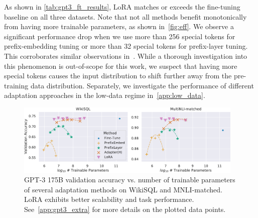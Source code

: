 As shown in \autoref{tab:gpt3_ft_results}, LoRA matches or exceeds the fine-tuning baseline on all three datasets.
Note that not all methods benefit monotonically from having more trainable parameters, as shown in~\autoref{fig:eff}.
We observe a significant performance drop when we use more than 256 special tokens for prefix-embedding tuning or more than 32 special tokens for prefix-layer tuning.
This corroborates similar observations in~\cite{li_prefix-tuning_2021}.
While a thorough investigation into this phenomenon is out-of-scope for this work, we suspect that having more special tokens causes the input distribution to shift further away from the pre-training data distribution.
Separately, we investigate the performance of different adaptation approaches in the low-data regime in~\autoref{app:low_data}.









\begin{figure}[h]
\centering
\includegraphics[width=0.97\textwidth]{figures/LoRA_wikisql.pdf}
\caption{GPT-3 175B validation accuracy vs. number of trainable parameters of several adaptation methods on WikiSQL and MNLI-matched. LoRA exhibits better scalability and task performance. See~\autoref{app:gpt3_extra} for more details on the plotted data points.}
\label{fig:eff}
\end{figure}

